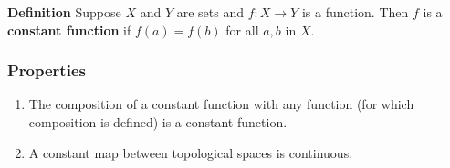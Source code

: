 \documentclass[12pt]{article}
\begin{document}
{\bf Definition} Suppose $X$ and $Y$ are sets and $f:X\to Y$ is a function.
Then $f$ is a {\bf constant function} if $f(a) = f(b)$ for all $a,b$
in $X$. 

\subsubsection{Properties}
\begin{enumerate}
\item The composition of a constant function 
with any function (for which composition is defined) is a constant function. 
\item A constant map between topological spaces is continuous. 
\end{enumerate}
\end{document}
